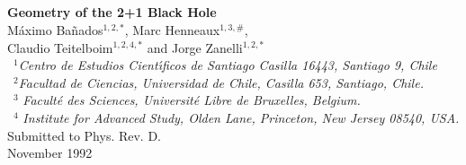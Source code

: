 

\flushbottom
\textwidth 15cm
\textheight 22cm
\topmargin -10mm

 
\newenvironment{eqn}{\setcounter{c1}{\value{equation}}
\setcounter{c2}{0}\addtocounter{c1}{1}
\renewcommand{\theequation}{A.\arabic{c1}\alph{c2}}
\begin{eqnarray}}{\end{eqnarray}\setcounter{equation}{\value{c1}}
\renewcommand{\theequation}{A.\arabic{equation}}}

\newcommand{\aum}{\addtocounter{c2}{1}}

\renewcommand \baselinestretch{1.3}
\renewcommand{\theequation}{\thesection.\arabic{equation}}
\newcommand{\bb}{\begin{equation}}
\newcommand{\ee}{\end{equation}}
\newcommand{\p}{\partial}
\newcommand{\m}{\mbox{$\frac{1}{2}$}}
\newcommand{\br}{\begin{eqnarray}}
\newcommand{\er}{\end{eqnarray}}


{}~\\
{}~\\
{}~\\
{}~\\
\begin{center}
{\huge {\bf Geometry of the 2+1 Black Hole}}\\
\vspace{3cm}
{\large M\'aximo Ba\~nados$^{1,2,*}$, Marc Henneaux$^{1,3,\#}$}, \\
{\large Claudio Teitelboim$^{1,2,4,*}$ and Jorge Zanelli$^{1,2,*}$} \\
\vspace{1.5cm}
{}~$^1${\em Centro de Estudios Cient\'{\i}ficos de Santiago
Casilla 16443, Santiago 9, Chile} \\
{}~$^2${\em Facultad de Ciencias, Universidad de Chile, Casilla 653,
Santiago, Chile.} \\
{}~$^3$ {\em Facult\'e des Sciences, Universit\'e
Libre de Bruxelles, Belgium.} \\
{}~$^4$ {\em Institute for Advanced Study, Olden Lane,
Princeton, New Jersey 08540, USA. }\\
\vspace{5cm}
Submitted to Phys. Rev. D. \\
November 1992
\end{center}


